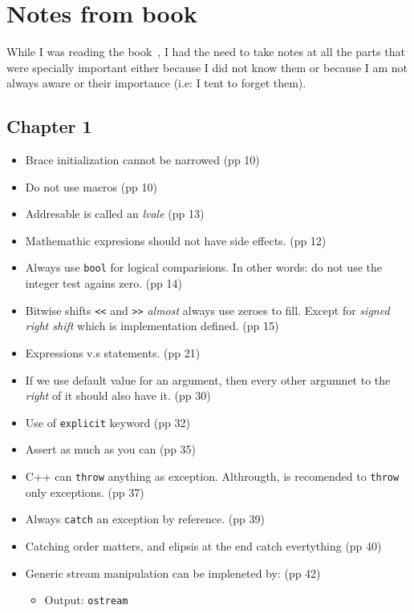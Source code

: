 \section{Notes from book}

While I was reading the book~\cite{Gottschling2015}, I had the need to take notes at all the parts that were specially important either because I did not know them or because I am not always aware or their importance (i.e: I tent to forget them).

\subsection{Chapter 1}
\begin{itemize}
 \item Brace initialization cannot be narrowed (pp 10)
 \item Do not use macros (pp 10)
 \item Addresable is called an \emph{lvale} (pp 13)
 \item Mathemathic expresions should not have side effects. (pp 12)
 \item Always use \texttt{bool} for logical comparisions. In other words: do not use the integer test agains zero. (pp 14)
 \item Bitwise shifts \texttt{<<} and \texttt{>>} \emph{almost} always use zeroes to fill. Except for \emph{signed right shift} which is implementation defined. (pp 15)
 \item Expressions v.s statements. (pp 21)
 \item If we use default value for an argument, then every other argumnet to the \emph{right} of it should also have it. (pp 30)
 \item Use of \texttt{explicit} keyword (pp 32)
 \item Assert as much as you can (pp 35)
 \item C++ can \texttt{throw} anything as exception. Althrougth, is recomended to \texttt{throw} only exceptions. (pp 37)
 \item Always \texttt{catch} an exception by reference. (pp 39)
 \item Catching order matters, and elipsis at the end catch evertything (pp 40)
 \item Generic stream manipulation can be impleneted by: (pp 42)
 \begin{itemize}
  \item Output: \texttt{ostream}

\end{itemize}
\end{itemize}

